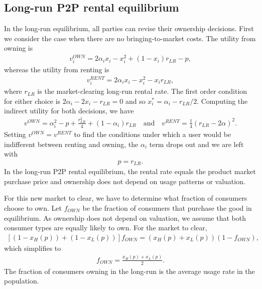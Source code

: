 \documentclass[11pt]{article}
\begin{document}
% 

\subsection{Long-run P2P rental equilibrium} 
In the long-run equilibrium, all parties can revise their ownership decisions. 
First we consider the case when there are no bringing-to-market costs.
The utility from owning is 
\begin{align}
v^{OWN}_i = 2\alpha_i x_i - x_i^2 + (1-x_i)r_{LR} - p,   
\end{align} 
whereas the utility from renting is 
\begin{align}
v^{RENT}_{i} = 2\alpha_i x_i - x_i^2 - x_i r_{LR}, 
\end{align} 
where $r_{LR}$ is the market-clearing long-run rental rate. 
The first order condition for either choice is $2 \alpha_i - 2 x_i - r_{LR} = 0$ and so $x^*_i = \alpha_i - r_{LR}/2$. 
Computing the indirect utility for both decisions, we have
\begin{align} 
v^{OWN} = \alpha_i^2 - p + \frac{r_{LR}^2}{4} + (1 - \alpha_i) r_{LR} \quad  \mbox{and} \quad v^{RENT} = \frac{1}{4} (r_{LR}- 2\alpha )^2. 
\end{align} 
Setting $v^{OWN} = v^{RENT}$ to find the conditions under which a user would be indifferent between renting and owning, the $\alpha_i$ term drops out and we are left with 
\begin{align}
p = r_{LR}. 
\end{align}
In the long-run P2P rental equilibrium, the rental rate equals the product market purchase price and ownership does not depend on usage patterns or valuation.  

For this new market to clear, we have to determine what fraction of consumers choose to own. 
Let $f_{OWN}$ be the fraction of consumers that purchase the good in equilibrium. 
As ownership does not depend on valuation, we assume that both consumer types are equally likely to own. 
For the market to clear, 
\begin{align}
\left[ (1-x_H(p)) + (1-x_L(p))\right]f_{OWN} = \left(x_H(p) + x_L(p) \right)(1- f_{OWN}), 
\end{align} 
which simplifies to 
\begin{align}
f_{OWN} = \frac{x_H(p) + x_L(p)}{2}.  
\end{align} 
The fraction of consumers owning in the long-run is the average usage rate in the population.  
\end{document}

